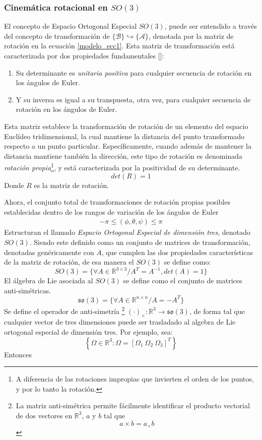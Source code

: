 \documentclass[10pt]{report}
\numberwithin{equation}{chapter}
\numberwithin{algorithm}{chapter}
\newcommand{\bcite}[1]{[\cite{#1}]}
\newcommand{\marco}[1]{\{\mathcal{#1}\}}
\begin{document}
\subsubsection{Cinemática rotacional en $SO(3)$}
El concepto de Espacio Ortogonal Especial $SO(3)$, puede ser entendido a través del concepto de transformación de $\marco{B}\hookrightarrow\marco{A}$, denotada por la matriz de rotación en la ecuación \eqref{modelo_ecc1}. Esta matriz de transformación está caracterizada por dos propiedades fundamentales \bcite{Trola2009}:
\begin{enumerate}
\item Su determinante es \emph{unitaria positiva} para cualquier secuencia de rotación en los ángulos de Euler.
\item Y su inversa es igual a su transpuesta, otra vez, para cualquier secuencia de rotación en los ángulos de Euler. 
\end{enumerate}
Esta matriz establece la transformación de rotación de un elemento del espacio Euclídeo tridimensional, la cual mantiene la distancia del punto transformado respecto a un punto particular.
Específicamente, cuando además de mantener la distancia mantiene también la dirección, este tipo de rotación es denominada \emph{rotación propia}\footnote{A diferencia de las rotaciones impropias que invierten el orden de los puntos, y por lo tanto la rotación.}, y está caracterizada por la positividad de su determinante.
\begin{equation}
det(R)=1
\end{equation}
Donde $R$ es la matriz de rotación.\par
Ahora, el conjunto total de transformaciones de rotación propias posibles establecidas dentro de los rangos de variación de los ángulos de Euler
\begin{gather*}
-\pi\leq(\phi,\theta,\psi)\leq\pi
\end{gather*}
Estructuran el llamado \emph{Espacio Ortogonal Especial de dimensión tres}, denotado $SO(3)$. Siendo este definido como un conjunto de matrices de transformación, denotadas genéricamente con $A$, que cumplen las dos propiedades características de la matriz de rotación, de esa manera el $SO(3)$ se define como:
$$SO(3)=\{\forall A \in \mathbb{R}^{3\times 3}/ A^T=A^{-1},det(A)=1\}$$
El álgebra de Lie asociada al $SO(3)$ se define como el conjunto de matrices anti-simétricas.
$$\mathfrak{so}(3)=\{\forall A \in \mathbb{R}^{n\times n}/ A=-A^T\}$$ 
Se define el operador de anti-simetría
\footnote{La matriz anti-simétrica permite fácilmente identificar el producto vectorial de dos vectores en $\mathbb{R}^3$, $a$ y $b$ tal que $$a\times b=a_\times b$$} $(\cdot)_\times:\mathbb{R}^3\rightarrow\mathfrak{so}(3)$, de forma tal que cualquier vector de tres dimensiones puede ser trasladado al algebra de Lie ortogonal especial de dimensión tres. Por ejemplo, sea: $$\left\{\Omega \in\mathbb{R}^3: \Omega=[\Omega_1~\Omega_2~\Omega_3]^T\right\}$$ Entonces
\end{document}
